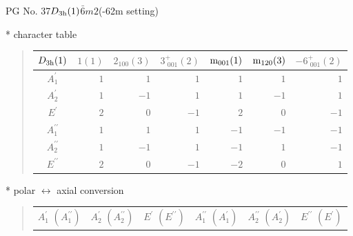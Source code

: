 \documentclass[fleqn,8pt,landscape]{jsarticle}
\begin{document}
\setcounter{MaxMatrixCols}{32}

\renewcommand{\tablename}{Table~}
\renewcommand{\figurename}{Figure~}
\begin{center}
\LARGE
PG No. 37\quad$D_{\rm 3h}(1)$\quad$\bar{6}m2$\quad(-62m setting)\quad[ hexagonal ]
\end{center}

* character table
\begin{quote}
\begin{tabular}{crrrrrr} \hline \hline
$ D_{\rm 3h}(1) $ & $ 1(1) $ & $ 2{}_{100}(3) $ & $ 3^{+}_{\,\,001}(2) $ & $ {\rm m}_{001}(1) $ & $ {\rm m}_{120}(3) $ & $ -6^{+}_{\,\,001}(2) $ \\ \hline
$ A_{1}^{\prime} $ & $ 1 $ & $ 1 $ & $ 1 $ & $ 1 $ & $ 1 $ & $ 1 $ \\
$ A_{2}^{\prime} $ & $ 1 $ & $ -1 $ & $ 1 $ & $ 1 $ & $ -1 $ & $ 1 $ \\
$ E^{\prime} $ & $ 2 $ & $ 0 $ & $ -1 $ & $ 2 $ & $ 0 $ & $ -1 $ \\
$ A_{1}^{\prime\prime} $ & $ 1 $ & $ 1 $ & $ 1 $ & $ -1 $ & $ -1 $ & $ -1 $ \\
$ A_{2}^{\prime\prime} $ & $ 1 $ & $ -1 $ & $ 1 $ & $ -1 $ & $ 1 $ & $ -1 $ \\
$ E^{\prime\prime} $ & $ 2 $ & $ 0 $ & $ -1 $ & $ -2 $ & $ 0 $ & $ 1 $ \\
 \hline \hline
\end{tabular}
\end{quote}

* polar $\leftrightarrow$ axial conversion
\begin{quote}
\begin{tabular}{cccccc}
$ A_{1}^{\prime}\,\,(A_{1}^{\prime\prime}) $ & $ A_{2}^{\prime}\,\,(A_{2}^{\prime\prime}) $ & $ E^{\prime}\,\,(E^{\prime\prime}) $ & $ A_{1}^{\prime\prime}\,\,(A_{1}^{\prime}) $ & $ A_{2}^{\prime\prime}\,\,(A_{2}^{\prime}) $ & $ E^{\prime\prime}\,\,(E^{\prime}) $
\end{tabular}
\end{quote}
\end{document}
